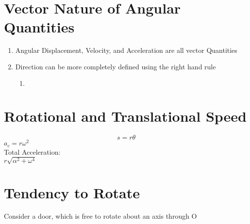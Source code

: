 \documentclass[]{article}
\date{}
\title{\docTitle}
\author{\docAuthor}
\date{\today}
\begin{document}
\maketitle
\section*{Vector Nature of Angular Quantities}
\begin{enumerate}
    \item Angular Displacement, Velocity, and Acceleration are all vector Quantities
    \item Direction can be more completely defined using the right hand rule
    \begin{enumerate}
        \item 
    \end{enumerate}
\end{enumerate}

\section*{Rotational and Translational Speed}
\begin{equation*}
    s = r\theta
\end{equation*}
$a_c = r\omega^2$\\
Total Acceleration:\\
$r\sqrt{\alpha^2+\omega^4}$\\

\section*{Tendency to Rotate}
Consider a door, which is free to rotate about an axis through O
\end{document}
